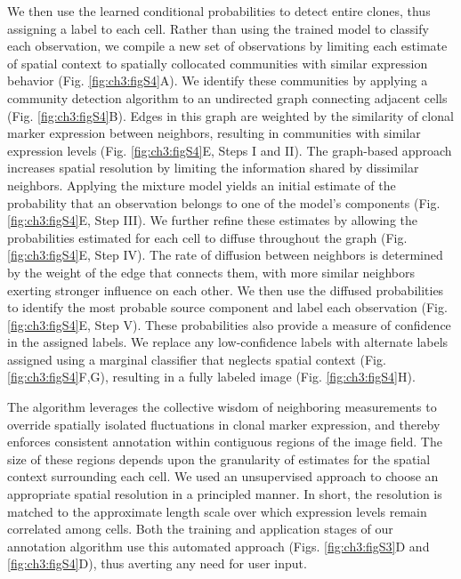 We then use the learned conditional probabilities to detect entire clones, thus assigning a label to each cell. Rather than using the trained model to classify each observation, we compile a new set of observations by limiting each estimate of spatial context to spatially collocated communities with similar expression behavior (Fig. \ref{fig:ch3:figS4}A). We identify these communities by applying a community detection algorithm to an undirected graph connecting adjacent cells (Fig. \ref{fig:ch3:figS4}B). Edges in this graph are weighted by the similarity of clonal marker expression between neighbors, resulting in communities with similar expression levels (Fig. \ref{fig:ch3:figS4}E, Steps I and II). The graph-based approach increases spatial resolution by limiting the information shared by dissimilar neighbors. Applying the mixture model yields an initial estimate of the probability that an observation belongs to one of the model's components (Fig. \ref{fig:ch3:figS4}E, Step III). We further refine these estimates by allowing the probabilities estimated for each cell to diffuse throughout the graph (Fig. \ref{fig:ch3:figS4}E, Step IV). The rate of diffusion between neighbors is determined by the weight of the edge that connects them, with more similar neighbors exerting stronger influence on each other. We then use the diffused probabilities to identify the most probable source component and label each observation (Fig. \ref{fig:ch3:figS4}E, Step V). These probabilities also provide a measure of confidence in the assigned labels. We replace any low-confidence labels with alternate labels assigned using a marginal classifier that neglects spatial context (Fig. \ref{fig:ch3:figS4}F,G), resulting in a fully labeled image (Fig. \ref{fig:ch3:figS4}H).

The algorithm leverages the collective wisdom of neighboring measurements to override spatially isolated fluctuations in clonal marker expression, and thereby enforces consistent annotation within contiguous regions of the image field. The size of these regions depends upon the granularity of estimates for the spatial context surrounding each cell. We used an unsupervised approach to choose an appropriate spatial resolution in a principled manner. In short, the resolution is matched to the approximate length scale over which expression levels remain correlated among cells. Both the training and application stages of our annotation algorithm use this automated approach (Figs. \ref{fig:ch3:figS3}D and \ref{fig:ch3:figS4}D), thus averting any need for user input.

